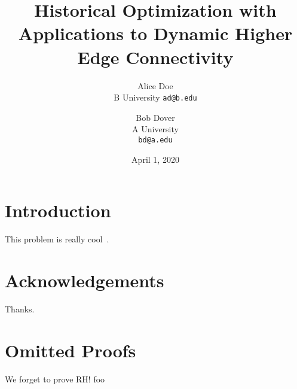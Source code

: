 \documentclass[12pt]{default}
\title{Historical Optimization with Applications to Dynamic Higher Edge Connectivity}
\author{
    Alice Doe\\
    B University
    \texttt{ad@b.edu}
    \and
    Bob Dover\\
    A University\\
    \texttt{bd@a.edu}
}
\date{April 1, 2020}
\begin{document}
\maketitle

\begin{abstract}
\end{abstract}

\clearpage
{}

\section{Introduction}
This problem is really cool~\cite{MolinaLovetS19}.
% 

\section*{Acknowledgements}
Thanks.

\clearpage


\clearpage
\appendix

\section{Omitted Proofs}
We forget to prove RH!  foo
% 
\end{document}
